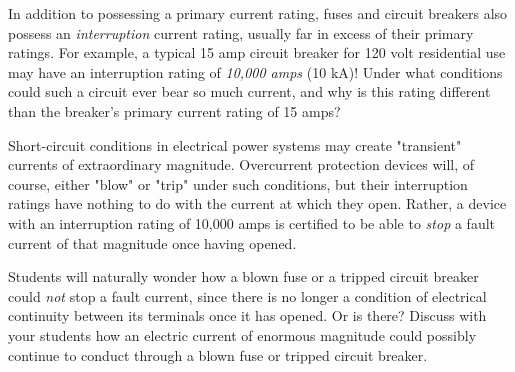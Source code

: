 

In addition to possessing a primary current rating, fuses and circuit breakers also possess an {\it interruption} current rating, usually far in excess of their primary ratings.  For example, a typical 15 amp circuit breaker for 120 volt residential use may have an interruption rating of {\it 10,000 amps} (10 kA)!  Under what conditions could such a circuit ever bear so much current, and why is this rating different than the breaker's primary current rating of 15 amps?







Short-circuit conditions in electrical power systems may create "transient" currents of extraordinary magnitude.  Overcurrent protection devices will, of course, either "blow" or "trip" under such conditions, but their interruption ratings have nothing to do with the current at which they open.  Rather, a device with an interruption rating of 10,000 amps is certified to be able to {\it stop} a fault current of that magnitude once having opened.







Students will naturally wonder how a blown fuse or a tripped circuit breaker could {\it not} stop a fault current, since there is no longer a condition of electrical continuity between its terminals once it has opened.  Or is there?  Discuss with your students how an electric current of enormous magnitude could possibly continue to conduct through a blown fuse or tripped circuit breaker.




